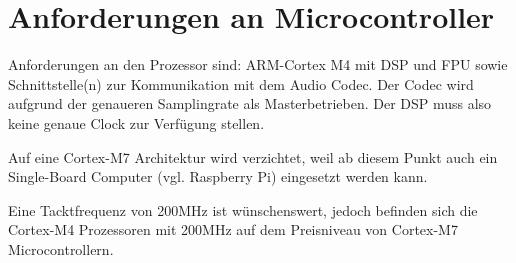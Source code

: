 \section{Anforderungen an Microcontroller}
\label{sec:Konzept_Microcontroller}

Anforderungen an den Prozessor sind: ARM-Cortex M4 mit DSP und FPU sowie Schnittstelle(n) zur Kommunikation mit dem Audio Codec. Der Codec wird aufgrund der genaueren Samplingrate als Masterbetrieben. Der DSP muss also keine genaue Clock zur Verfügung stellen. 

Auf eine Cortex-M7 Architektur wird verzichtet, weil ab diesem Punkt auch ein Single-Board Computer (vgl. Raspberry Pi) eingesetzt werden kann.

Eine Tacktfrequenz von 200MHz ist wünschenswert, jedoch befinden sich die Cortex-M4 Prozessoren mit 200MHz auf dem Preisniveau von Cortex-M7 Microcontrollern.


